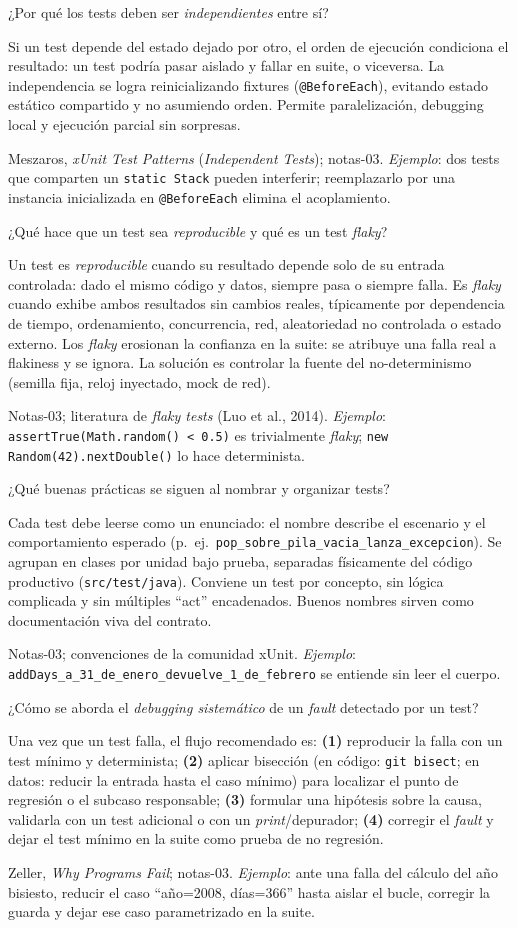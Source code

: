 \documentclass[11pt,a4paper]{article}
\newcounter{preg}
\newcommand{\qa}[3]{%
  \stepcounter{preg}%
  \vspace{0.4em}
  \begin{preguntabox}{\thepreg}
  #1
  \end{preguntabox}
  \begin{respuestabox}
  #2
  \end{respuestabox}
  \begin{refbox}
  #3
  \end{refbox}
  \vspace{0.6em}
}
\begin{document}
\qa{¿Por qué los tests deben ser \emph{independientes} entre sí?}
{Si un test depende del estado dejado por otro, el orden de ejecución condiciona el resultado: un test podría pasar aislado y fallar en suite, o viceversa. La independencia se logra reinicializando fixtures (\texttt{@BeforeEach}), evitando estado estático compartido y no asumiendo orden. Permite paralelización, debugging local y ejecución parcial sin sorpresas.}
{Meszaros, \emph{xUnit Test Patterns} (\emph{Independent Tests}); notas-03. \emph{Ejemplo}: dos tests que comparten un \texttt{static Stack} pueden interferir; reemplazarlo por una instancia inicializada en \texttt{@BeforeEach} elimina el acoplamiento.}

\qa{¿Qué hace que un test sea \emph{reproducible} y qué es un test \emph{flaky}?}
{Un test es \emph{reproducible} cuando su resultado depende solo de su entrada controlada: dado el mismo código y datos, siempre pasa o siempre falla. Es \emph{flaky} cuando exhibe ambos resultados sin cambios reales, típicamente por dependencia de tiempo, ordenamiento, concurrencia, red, aleatoriedad no controlada o estado externo. Los \emph{flaky} erosionan la confianza en la suite: se atribuye una falla real a flakiness y se ignora. La solución es controlar la fuente del no-determinismo (semilla fija, reloj inyectado, mock de red).}
{Notas-03; literatura de \emph{flaky tests} (Luo et al., 2014). \emph{Ejemplo}: \texttt{assertTrue(Math.random() < 0.5)} es trivialmente \emph{flaky}; \texttt{new Random(42).nextDouble()} lo hace determinista.}

\qa{¿Qué buenas prácticas se siguen al nombrar y organizar tests?}
{Cada test debe leerse como un enunciado: el nombre describe el escenario y el comportamiento esperado (p.~ej.\ \texttt{pop\_sobre\_pila\_vacia\_lanza\_excepcion}). Se agrupan en clases por unidad bajo prueba, separadas físicamente del código productivo (\texttt{src/test/java}). Conviene un test por concepto, sin lógica complicada y sin múltiples ``act'' encadenados. Buenos nombres sirven como documentación viva del contrato.}
{Notas-03; convenciones de la comunidad xUnit. \emph{Ejemplo}: \texttt{addDays\_a\_31\_de\_enero\_devuelve\_1\_de\_febrero} se entiende sin leer el cuerpo.}

\qa{¿Cómo se aborda el \emph{debugging sistemático} de un \emph{fault} detectado por un test?}
{Una vez que un test falla, el flujo recomendado es: \textbf{(1)} reproducir la falla con un test mínimo y determinista; \textbf{(2)} aplicar bisección (en código: \texttt{git bisect}; en datos: reducir la entrada hasta el caso mínimo) para localizar el punto de regresión o el subcaso responsable; \textbf{(3)} formular una hipótesis sobre la causa, validarla con un test adicional o con un \emph{print}/depurador; \textbf{(4)} corregir el \emph{fault} y dejar el test mínimo en la suite como prueba de no regresión.}
{Zeller, \emph{Why Programs Fail}; notas-03. \emph{Ejemplo}: ante una falla del cálculo del año bisiesto, reducir el caso ``año=2008, días=366'' hasta aislar el bucle, corregir la guarda y dejar ese caso parametrizado en la suite.}
\end{document}
